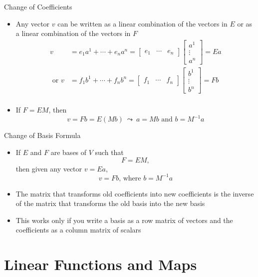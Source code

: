 \documentclass[usenames,dvipsnames,10pt]{beamer}
\begin{document}
\begin{frame}
  {Change of Coefficients}

  \begin{itemize}
  \item Any vector $v$ can be written as a linear combination of the vectors in $E$ or as a linear combination of the vectors in $F$
    \begin{align*}
      v &= e_1a^1 + \cdots + e_na^n = \begin{bmatrix} e_1 & \cdots & e_n \end{bmatrix}\begin{bmatrix} a^1 \\ \vdots \\ a^n\end{bmatrix} = Ea\\
      \text{ or }
      v &= f_1b^1 + \cdots + f_nb^n = \begin{bmatrix} f_1 & \cdots & f_n \end{bmatrix}\begin{bmatrix} b^1 \\ \vdots \\ b^n\end{bmatrix} = Fb\\
    \end{align*}
  \item If $F = EM$, then
    \[
      v = Fb = E(Mb)\ \leadsto\ a = Mb\text{ and }b = M^{-1}a
    \]
  \end{itemize}
\end{frame}

\begin{frame}
  {Change of Basis Formula}

  \begin{itemize}
  \item If $E$ and $F$ are bases of $V$ such that
    \[
      F = EM,
    \]
    then given any vector $v = Ea$,
    \[
      v = Fb\text{, where }b = M^{-1}a
    \]
  \item The matrix that transforms old coefficients into new coefficients is the inverse of the matrix that transforms the old basis into the new basis
  \item This works only if you write a basis as a row matrix of vectors and the coefficients as a column matrix of scalars
  \end{itemize}
\end{frame}

\section{Linear Functions and Maps}
\end{document}
